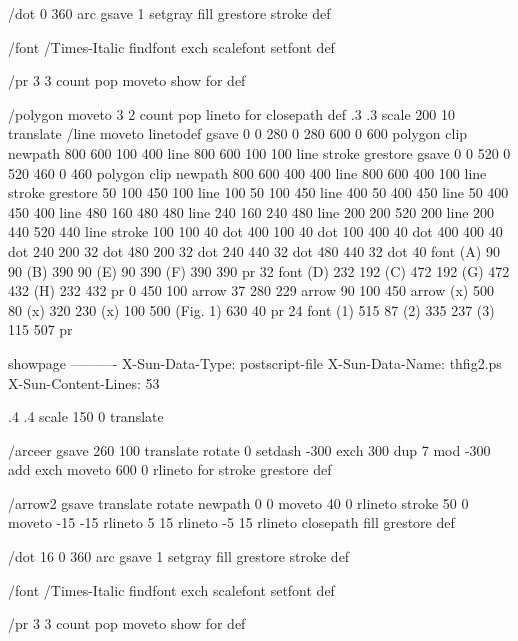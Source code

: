 /dot  {0 360 arc gsave 1 setgray fill grestore stroke} def

/font {/Times-Italic findfont exch scalefont setfont} def %

/pr {3 3 count {pop moveto show} for} def


/polygon {moveto 3 2 count {pop lineto} for closepath} def
.3 .3 scale 200 10 translate
/line {moveto lineto}def
gsave 0 0 280 0 280 600 0 600 polygon clip newpath
800 600 100 400  line
800 600 100 100 line stroke
grestore
gsave 0 0 520 0 520 460 0 460 polygon clip newpath
800 600 400 400 line
800 600 400 100 line stroke
grestore
50 100 450 100 line
100 50 100 450 line
400 50 400 450 line
50 400 450 400 line
480 160 480 480 line
240 160 240 480 line
200 200 520 200 line
200 440 520 440 line stroke
100 100 40 dot 400 100 40 dot
100 400 40 dot 400 400 40 dot
240 200 32 dot 480 200 32 dot
240 440 32 dot 480 440 32 dot
40 font (A) 90 90 (B) 390 90 (E) 90 390 (F) 390 390 pr
32 font (D) 232 192 (C) 472 192 (G) 472 432 (H) 232 432 pr
0 450 100 arrow 37 280 229 arrow 90 100 450 arrow
(x) 500 80 (x) 320 230 (x) 100 500 (Fig. 1) 630 40 pr
24 font (1) 515 87 (2) 335 237 (3) 115 507 pr

showpage
----------
X-Sun-Data-Type: postscript-file
X-Sun-Data-Name: thfig2.ps
X-Sun-Content-Lines: 53


.4 .4 scale 150 0 translate  %


/arceer {gsave 260 100 translate rotate 0 setdash -300 exch 300
    {dup 7 mod -300 add exch moveto 600 0 rlineto} for stroke grestore} def


/arrow2 {gsave translate rotate newpath  0 0 moveto
    40 0 rlineto stroke 50 0 moveto -15 -15 rlineto 5 15 rlineto
    -5 15 rlineto closepath fill grestore} def   %


/dot  {16 0 360 arc gsave 1 setgray fill grestore stroke} def

/font {/Times-Italic findfont exch scalefont setfont} def %

/pr {3 3 count {pop moveto show} for} def


